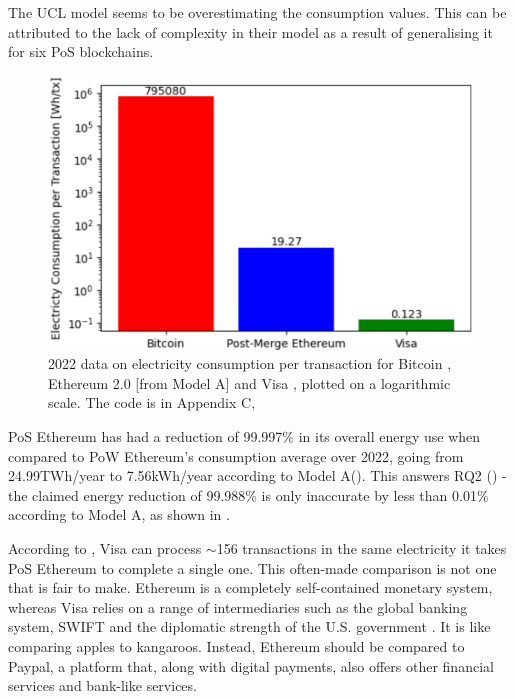 The UCL model seems to be overestimating the consumption values. This can be attributed to the lack of complexity in their model as a result of generalising it for six PoS blockchains.

\begin{figure}[!htb]
    \includegraphics[width=13cm,center]{Figures/ElectricityConsumptionPlot.png}
    \caption{2022 data on electricity consumption per transaction for Bitcoin \cite{BitcoinDigiconomist}, Ethereum 2.0 [from Model A] and Visa \cite{2022VisaReport}, \cite{VisaHome} plotted on a logarithmic scale. The code is in Appendix C, }
    \label{Figure:ElectricityConsumptionPlot}
\end{figure}

PoS Ethereum has had a reduction of 99.997\% in its overall energy use when compared to PoW Ethereum's consumption average over 2022, going from 24.99TWh/year to 7.56kWh/year according to Model A(\cite{CCRIIndices}). This answers RQ2 () - the claimed energy reduction of 99.988\% is only inaccurate by less than 0.01\% according to Model A, as shown in .

According to , Visa can process 
$\sim$156 transactions in the same electricity it takes PoS Ethereum to complete a single one. This often-made comparison is not one that is fair to make. Ethereum is a completely self-contained monetary system, whereas Visa relies on a range of intermediaries such as the global banking system, SWIFT and the diplomatic strength of the U.S. government \cite{Carter2021BitcoinComparison}. It is like comparing apples to kangaroos. Instead, Ethereum should be compared to Paypal, a platform that, along with digital payments, also offers other financial services and bank-like services.  

